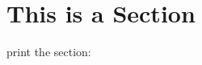 \documentclass[11pt]{article}
\begin{document}
\section{This is a Section}

print the section: \thesection
\end{document}
